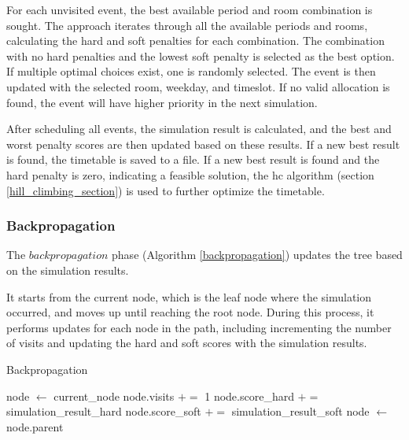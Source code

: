
For each unvisited event, the best available period and room combination is sought. The approach iterates through all the available periods and rooms, calculating the hard and soft penalties for each combination. The combination with no hard penalties and the lowest soft penalty is selected as the best option. If multiple optimal choices exist, one is randomly selected. The event is then updated with the selected room, weekday, and timeslot. If no valid allocation is found, the event will have higher priority in the next simulation.

After scheduling all events, the simulation result is calculated, and the best and worst penalty scores are then updated based on these results. If a new best result is found, the timetable is saved to a file. If a new best result is found and the hard penalty is zero, indicating a feasible solution, the \ac{hc} algorithm (section \ref{hill_climbing_section}) is used to further optimize the timetable.


\subsubsection{Backpropagation}

The \(backpropagation\) phase (Algorithm \ref{backpropagation}) updates the tree based on the simulation results. 

It starts from the current node, which is the leaf node where the simulation occurred, and moves up until reaching the root node. During this process, it performs updates for each node in the path, including incrementing the number of visits and updating the hard and soft scores with the simulation results. 

\begin{algorithm}
\caption{Backpropagation}\label{backpropagation}
\begin{algorithmic}[1]
    \State node $\gets$ current\_node
        \State node.visits $+=$ 1
        \State node.score\_hard $+=$ simulation\_result\_hard
        \State node.score\_soft $+=$ simulation\_result\_soft
        \State node $\gets$ node.parent
    \EndWhile
\EndFunction
\end{algorithmic}
\end{algorithm}

